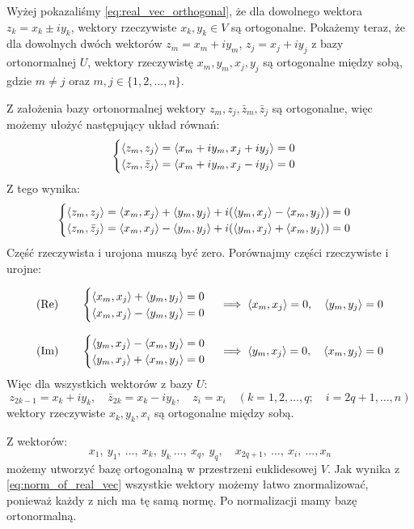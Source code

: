 Wyżej pokazaliśmy \eqref{eq:real_vec_orthogonal}, że dla dowolnego wektora $z_{k} = x_k \pm iy_k$, wektory rzeczywiste $x_k, y_k \in V$ są ortogonalne. Pokażemy teraz, że dla dowolnych dwóch wektorów $z_m = x_m + iy_m$, $z_j = x_j + iy_j$ z bazy ortonormalnej $U$, wektory rzeczywistę $x_m, y_m, x_j, y_j$ są ortogonalne między sobą, gdzie $m \neq j$ oraz $m, j \in \{1, 2, \ldots, n\}$.

Z założenia bazy ortonormalnej wektory $z_m, z_j, \bar{z}_m, \bar{z}_j$ są ortogonalne, więc możemy ułożyć następujący układ równań:
\[
\begin{cases}
\left\langle z_m, z_j \right\rangle = \left\langle x_m + iy_m, x_j + iy_j \right\rangle = 0 \\
\left\langle z_m, \bar{z}_j \right\rangle = \left\langle x_m + iy_m, x_j - iy_j \right\rangle = 0
\end{cases}
\]
Z tego wynika:
\[
\begin{cases}
\left\langle z_m, z_j \right\rangle = \left\langle x_m, x_j \right\rangle + \left\langle y_m, y_j \right\rangle + i(\left\langle y_m, x_j \right\rangle - \left\langle x_m, y_j \right\rangle) = 0 \\
\left\langle z_m, \bar{z}_j \right\rangle = \left\langle x_m, x_j \right\rangle - \left\langle y_m, y_j \right\rangle + i(\left\langle y_m, x_j \right\rangle + \left\langle x_m, y_j \right\rangle) = 0
\end{cases}
\]
Część rzeczywista i urojona muszą być zero. Porównajmy części rzeczywiste i urojne:

\[
\text{(Re)} \qquad
\begin{cases}
\left\langle x_m, x_j \right\rangle + \left\langle y_m, y_j \right\rangle = 0 \\
\left\langle x_m, x_j \right\rangle - \left\langle y_m, y_j \right\rangle = 0
\end{cases}
\implies \left\langle x_m, x_j \right\rangle = 0, \quad \left\langle y_m, y_j \right\rangle = 0
\]

\[
\text{(Im)} \qquad
\begin{cases}
\left\langle y_m, x_j \right\rangle - \left\langle x_m, y_j \right\rangle = 0 \\
\left\langle y_m, x_j \right\rangle + \left\langle x_m, y_j \right\rangle = 0
\end{cases}
\implies \left\langle y_m, x_j \right\rangle = 0, \quad \left\langle x_m, y_j \right\rangle = 0
\]
Więc dla wszystkich wektorów z bazy $U$:
$$z_{2k-1} = x_k + iy_k, \quad \bar{z}_{2k} = x_k - iy_k, \quad z_i = x_i \quad (k = 1, 2, \ldots, q; \quad i = 2q + 1, \ldots, n)$$
wektory rzeczywiste $x_k, y_k, x_i$ są ortogonalne między sobą. 

Z wektorów:
\begin{equation}\label{eq:real_base}
x_1, \ y_1, \ \ldots, \ x_k, \ y_k \ \ldots, \ x_q, \ y_q, \quad x_{2q+1}, \ \ldots, \ x_i, \ \ldots, x_n
\end{equation}
możemy utworzyć bazę ortogonalną w przestrzeni euklidesowej $V$. Jak wynika z \eqref{eq:norm_of_real_vec} wszystkie wektory możemy łatwo znormalizować, ponieważ każdy z nich ma tę samą normę. Po normalizacji mamy bazę ortonormalną.
 
